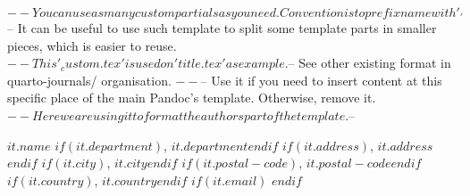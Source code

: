 $-- You can use as many custom partials as you need. Convention is to prefix name with '_'
$-- It can be useful to use such template to split some template parts in smaller pieces, which is easier to reuse. 
$-- This '_custom.tex' is used on 'title.tex' as example.
$-- See other existing format in quarto-journals/ organisation.
$-- %
$-- Use it if you need to insert content at this specific place of the main Pandoc's template. Otherwise, remove it.
$-- Here we are using it to format the authors part of the template.
$-- %

$it.name$%
$if(it.department)$, $it.department$$endif$%
$if(it.address)$, $it.address$$endif$%
$if(it.city)$, $it.city$$endif$%
$if(it.postal-code)$, $it.postal-code$$endif$%
$if(it.country)$, $it.country$$endif$%
$if(it.email)$ $endif$